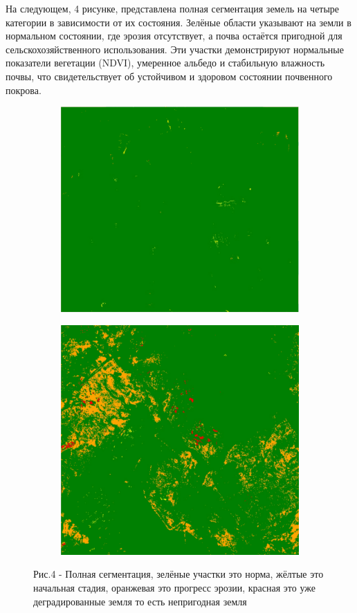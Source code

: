 \begin{multicols}{2}
На следующем, 4 рисунке, представлена полная сегментация земель на
четыре категории в зависимости от их состояния. Зелёные области
указывают на земли в нормальном состоянии, где эрозия отсутствует, а
почва остаётся пригодной для сельскохозяйственного использования. Эти
участки демонстрируют нормальные показатели вегетации (NDVI), умеренное
альбедо и стабильную влажность почвы, что свидетельствует об устойчивом
и здоровом состоянии почвенного покрова.
\end{multicols}

\begin{figure}[H]
   \centering
   \begin{subfigure}{0.45\textwidth}
   	\centering
   	\includegraphics[width=\textwidth, height=0.8\textwidth]{media/ict/image37}
   \end{subfigure}
   \begin{subfigure}{0.45\textwidth}
   	\centering
   	\includegraphics[width=\textwidth, height=0.8\textwidth]{media/ict/image38}
   \end{subfigure}
   \caption*{Рис.4 - Полная сегментация, зелёные участки это норма, жёлтые это начальная стадия, оранжевая это прогресс эрозии, красная это уже деградированные земля то есть непригодная земля}
\end{figure}

